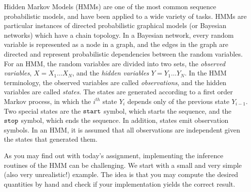 
Hidden Markov Models (HMMs) are one of the most common sequence
probabilistic models, and have been applied to a wide variety of
tasks. HMMs are particular instances of directed probabilistic graphical models (or Bayesian networks) which have a chain topology. 
In a
Bayesian network, every random variable is represented as a node in a
graph, and the edges in the graph are directed and represent
probabilistic dependencies between the random variables. For an HMM, the random variables are divided into two sets, the 
\emph{observed variables}, $X = X_1\ldots X_N$, 
and the \emph{hidden variables} $Y = Y_1\ldots Y_N$.
In the HMM
terminology, the observed variables are called \emph{observations}, and the
hidden variables are called \emph{states}. 
The states are generated according to a first order Markov process, in which the $i^{th}$ state $Y_i$ depends only 
of the previous state $Y_{i-1}$. 
Two special states are the ${\tt start}$ symbol,
which starts the sequence, and 
the ${\tt stop}$ symbol, which ends the sequence. 
In addition, states emit observation symbols. In an HMM, it is assumed that all
observations are independent given the states
that generated them.


As you may find out with today's assignment, 
implementing the inference routines of the HMM can be challenging. We start with a small and very
simple (also very unrealistic!) example. The idea is that you may compute the desired
quantities by hand and check if your implementation yields the correct result. 

